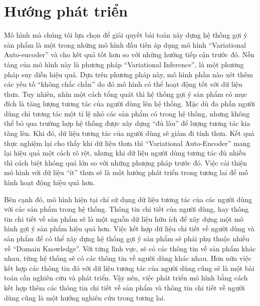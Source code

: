 \section{Hướng phát triển}
Mô hình mà chúng tôi lựa chọn để giải quyết bài toán xây dựng hệ thống gợi ý sản phẩm là một trong những mô hình đầu tiên áp dụng mô hình ``Variational Auto-encoder'' và cho kết quả tốt hơn so với những hướng tiếp cận trước đó.
Nền tảng của mô hình này là phương pháp ``Variational Inference'', là một phương pháp suy diễn hiệu quả.
Dựa trên phương pháp này, mô hình phần nào xét thêm các yếu tố ``không chắc chắn'' do đó mô hình có thể hoạt động tốt với dữ liệu thưa.
Tuy nhiên, nhìn một cách tổng quát thì hệ thống gợi ý sản phẩm có mục đích là tăng lượng tương tác của người dùng lên hệ thống.
Mặc dù đa phần người dùng chỉ tương tác một tỉ lệ nhỏ các sản phẩm có trong hệ thống, nhưng không thể bỏ qua trường hợp hệ thống được xây dựng ``đủ lâu'' để lượng tương tác kia tăng lên.
Khi đó, dữ liệu tương tác của người dùng sẽ giảm đi tính thưa. 
Kết quả thực nghiệm lại cho thấy khi dữ liệu thưa thì ``Variational Auto-Encoder'' mang lại hiệu quả một cách rõ rệt,
nhưng khi dữ liệu người dùng tương tác đủ nhiều thì cách biệt không quá lớn so với những phượng pháp trước đó.
Việc cải thiện mô hình với dữ liệu ``ít'' thưa sẽ là một hướng phát triển trong tương lai để mô hình hoạt động hiệu quả hơn.

Bên cạnh đó, mô hình hiện tại chỉ sử dụng dữ liệu tương tác của các người dùng với các sản phẩm trong hệ thống.
Thông tin chi tiết của người dùng, hay thông tin chi tiết về sản phẩm sẽ là một nguồn dữ liệu hữu ích để xây dựng một mô hình gợi ý sản phẩm hiệu quả hơn. 
Việc kết hợp dữ liệu chi tiết về người dùng và sản phẩm để có thể xây dựng hệ thống gợi ý sản phẩm sẽ phải phụ thuộc nhiều về ``Domain Knowledge''.
Với từng lĩnh vực, sẽ có các thông tin về sản phẩm khác nhau, từng hệ thống sẽ có các thông tin về người dùng khác nhau.
Hơn nữa việc kết hợp các thông tin đó với dữ liệu tương tác của người dùng cũng sẽ là một bài toán cần nghiên cứu và phát triển.
Vậy nên, việc phát triển mô hình bằng cách kết hợp thêm các thông tin chi tiết về sản phẩm và thông tin chi tiết về người dùng cũng là một hướng nghiên cứu trong tương lai.
